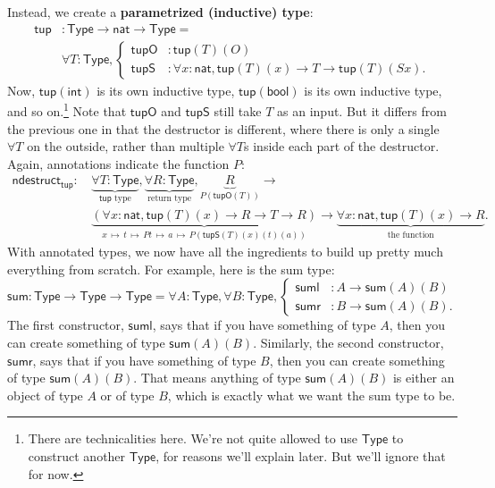 \documentclass[11pt,paper=letter]{scrartcl}
\newcommand{\sf}{\mathsf}
\newcommand{\type}{\mathsf{Type}}
\newcommand{\smapsto}{\,\mapsto\,}
\begin{document}
Instead, we create a \textbf{parametrized (inductive) type}:
\begin{align*}
\sf{tup}&: \type \to \sf{nat} \to \type = \\
&\forall T: \type, \begin{cases}
\sf{tupO}&: \sf{tup}(T)(O) \\
\sf{tupS}&: \forall x: \sf{nat}, \sf{tup}(T)(x) \to T \to \sf{tup}(T)(Sx).
\end{cases}
\end{align*}
Now, $\sf{tup}(\sf{int})$ is its own inductive type, $\sf{tup}(\sf{bool})$ is its own inductive type, and so on.\footnote{There are technicalities here. We're not quite allowed to use $\type$ to construct another $\type$, for reasons we'll explain later. But we'll ignore that for now.} Note that $\sf{tupO}$ and $\sf{tupS}$ still take $T$ as an input. But it differs from the previous one in that the destructor is different, where there is only a single $\forall T$ on the outside, rather than multiple $\forall T$s inside each part of the destructor. Again, annotations indicate the function $P$:
\begin{align*}
\sf{ndestruct}_\sf{tup}:\,
&\underbrace{\forall T: \type}_{\sf{tup}\text{ type}},
\underbrace{\forall R: \type}_{\text{return type}},
\underbrace{R}_{P(\sf{tupO}(T))} \to\\
&\underbrace{(\forall x: \sf{nat}, \sf{tup}(T)(x) \to R \to T \to R)}_{x\smapsto t \smapsto Pt \smapsto a \smapsto P(\sf{tupS}(T)(x)(t)(a))} \to
\underbrace{\forall x: \sf{nat}, \sf{tup}(T)(x) \to R}_{\text{the function}}.
\end{align*}
With annotated types, we now have all the ingredients to build up pretty much everything from scratch. For example, here is the sum type: \[
\sf{sum}: \type \to \type \to \type =
\forall A: \type, \forall B: \type, 
  \begin{cases}
  \sf{suml}&: A \to \sf{sum}(A)(B) \\
  \sf{sumr}&: B \to \sf{sum}(A)(B).
  \end{cases}
\]
The first constructor, $\sf{suml}$, says that if you have something of type $A$, then you can create something of type $\sf{sum}(A)(B)$. Similarly, the second constructor, $\sf{sumr}$, says that if you have something of type $B$, then you can create something of type $\sf{sum}(A)(B)$. That means anything of type $\sf{sum}(A)(B)$ is either an object of type $A$ or of type $B$, which is exactly what we want the sum type to be.
\end{document}
